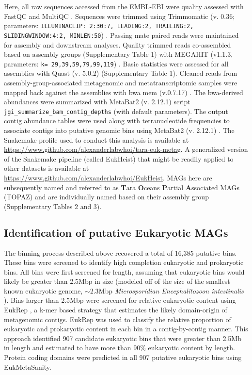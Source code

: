\documentclass[12pt]{article}
\numberwithin{equation}{section}
\begin{document}
Here, all raw sequences accessed from the EMBL-EBI were quality assessed with FastQC and MultiQC \citep{Andrews2010FastQC}. Sequences were trimmed using Trimmomatic (v. 0.36; parameters: \texttt{ILLUMINACLIP: 2:30:7, LEADING:2, TRAILING:2, SLIDINGWINDOW:4:2, MINLEN:50}) \citep{Bolger2014Trimmomatic}. Passing mate paired reads were maintained for assembly and downstream analyses. Quality trimmed reads co-assembled based on assembly groups (Supplementary Table 1) with MEGAHIT (v1.1.3, parameters: \texttt{k= 29,39,59,79,99,119}) \citep{Li2015MEGAHIT}. Basic statistics were assessed for all assemblies with Quast (v. 5.0.2) \citep{Gurevich_2013} (Supplementary Table 1). Cleaned reads from assembly-group-associated metagenomic and metatranscriptomic samples were mapped back against the assemblies with bwa mem (v.0.7.17) \citep{Li2010Fast}. The bwa-derived abundances were summarized with MetaBat2 (v. 2.12.1) script \texttt{jgi\_summarize\_bam\_contig\_depths} (with default parameters). The output contig abundance tables were used along with tetranucleotide frequencies to associate contigs into putative genomic bins using MetaBat2 (v. 2.12.1) \citep{Kang_2019}. The Snakemake profile used to conduct this analysis is available at \url{https://www.github.com/alexanderlabwhoi/tara-euk-metag}. A generalized version of the Snakemake pipeline (called EukHeist) that might be readily applied to other datasets is available at \url{https://www.github.com/alexanderlabwhoi/EukHeist}. MAGs here are subsequently named and referred to as \textbf{T}ara \textbf{O}ceans \textbf{P}artial \textbf{A}ssociated MAGs (TOPAZ) and are individually named based on their assembly group (Supplementary Tables 2 and 3).

\subsection*{Identification of putative Eukaryotic MAGs} The binning process described above recovered a total of 16,385 putative bins. These bins were screened to identify high completion eukaryotic and prokaryotic bins. All bins were first screened for length, assuming that eukaryotic bins would likely be greater than 2.5Mbp in size (modeled off of the size of the smallest known eukaryotic genome, $\sim 2.3$Mbp \textit{Microsporidian Encephalitozoon intestinalis} \citep{Corradi2010complete}). Bins larger than 2.5Mbp were screened for relative eukaryotic content using EukRep \citep{West2018Genome-reconstruction}, a k-mer based strategy that estimates the likely domain-origin of metagenomic contigs. EukRep was used to classify the relative proportion of eukaryotic and prokaryotic content in each bin in a contig-by-contig manner. This approach identified 907 candidate eukaryotic bins that were greater than 2.5Mb in length and estimated to have more than 90\% eukaryotic content by length. Protein coding domains were predicted in all 907 putative eukaryotic bins using EukMetaSanity. 
\end{document}
